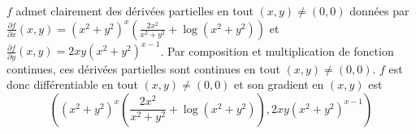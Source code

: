 \documentclass{report}
\begin{document}
\subsection{} \noindent{}\\ 
\\ 
\\
\noindent $f$ admet clairement des dérivées partielles en tout $(x,y)\neq (0,0)$ données par $\frac{\partial f}{\partial x}(x,y) = \left(x^2+y^2\right)^x \left(\frac{2 x^2}{x^2+y^2}+\log \left(x^2+y^2\right)\right)$ et $\frac{\partial f}{\partial y}(x,y) = 2 x y \left(x^2+y^2\right)^{x-1}$.\newline
Par composition et multiplication de fonction continues, ces dérivées partielles sont continues en tout $(x,y)\neq (0,0)$.\newline
$f$ est donc différentiable en tout $(x,y)\neq (0,0)$ et son gradient en $(x,y)$ est $$\left(\left(x^2+y^2\right)^x \left(\frac{2 x^2}{x^2+y^2}+\log \left(x^2+y^2\right)\right),2 x y \left(x^2+y^2\right)^{x-1}\right)$$
\end{document}
